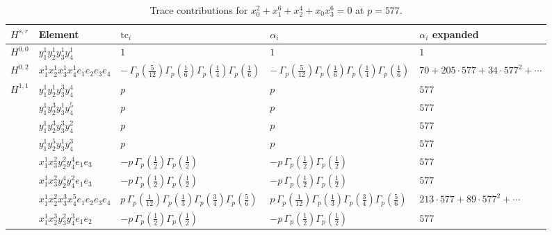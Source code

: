 \documentclass[11pt]{article}
\begin{document}
\begin{table}[ht]
\centering
\caption{Trace contributions for $x_0^{2} + x_1^{6} + x_2^{4} + x_0 x_3^{6} = 0$ at $p=577$.}\label{tab:deformed-27}
\renewcommand{\arraystretch}{1.1}
{\scriptsize
\begin{tabular}{@{}lllll@{}}
\toprule
$H^{s,r}$ & Element & $\mathrm{tc}_i$ & $\alpha_i$ & $\alpha_i$ expanded \\
\midrule
$H^{0,0}$ & $y_{1}^{1} y_{2}^{1} y_{3}^{1} y_{4}^{1}$ & $1$ & $1$ & $1$ \\
\midrule
$H^{0,2}$ & $x_{1}^{1} x_{2}^{1} x_{3}^{1} x_{4}^{1}  e_{1} e_{2} e_{3} e_{4}$ & $- \, \Gamma_p \left( \frac{5}{12} \right) \Gamma_p \left( \frac{1}{6} \right) \Gamma_p \left( \frac{1}{4} \right) \Gamma_p \left( \frac{1}{6} \right)$ & $- \, \Gamma_p \left( \frac{5}{12} \right) \Gamma_p \left( \frac{1}{6} \right) \Gamma_p \left( \frac{1}{4} \right) \Gamma_p \left( \frac{1}{6} \right)$ & $70{+}205{\cdot}577{+}34{\cdot}577^{2}{+}\cdots$ \\
\midrule
$H^{1,1}$ & $y_{1}^{1} y_{2}^{1} y_{3}^{3} y_{4}^{4}$ & $p \,$ & $p \,$ & $577$ \\
 & $y_{1}^{1} y_{2}^{3} y_{3}^{1} y_{4}^{5}$ & $p \,$ & $p \,$ & $577$ \\
 & $y_{1}^{1} y_{2}^{3} y_{3}^{3} y_{4}^{2}$ & $p \,$ & $p \,$ & $577$ \\
 & $y_{1}^{1} y_{2}^{5} y_{3}^{1} y_{4}^{3}$ & $p \,$ & $p \,$ & $577$ \\
 & $x_{1}^{1} x_{3}^{2} y_{2}^{2} y_{4}^{4} e_{1} e_{3}$ & $- p \, \Gamma_p \left( \frac{1}{2} \right) \Gamma_p \left( \frac{1}{2} \right)$ & $- p \, \Gamma_p \left( \frac{1}{2} \right) \Gamma_p \left( \frac{1}{2} \right)$ & $577$ \\
 & $x_{1}^{1} x_{3}^{2} y_{2}^{4} y_{4}^{2} e_{1} e_{3}$ & $- p \, \Gamma_p \left( \frac{1}{2} \right) \Gamma_p \left( \frac{1}{2} \right)$ & $- p \, \Gamma_p \left( \frac{1}{2} \right) \Gamma_p \left( \frac{1}{2} \right)$ & $577$ \\
 & $x_{1}^{1} x_{2}^{2} x_{3}^{3} x_{4}^{5}  e_{1} e_{2} e_{3} e_{4}$ & $p \, \Gamma_p \left( \frac{1}{12} \right) \Gamma_p \left( \frac{1}{3} \right) \Gamma_p \left( \frac{3}{4} \right) \Gamma_p \left( \frac{5}{6} \right)$ & $p \, \Gamma_p \left( \frac{1}{12} \right) \Gamma_p \left( \frac{1}{3} \right) \Gamma_p \left( \frac{3}{4} \right) \Gamma_p \left( \frac{5}{6} \right)$ & $213{\cdot}577{+}89{\cdot}577^{2}{+}\cdots$ \\
 & $x_{1}^{1} x_{2}^{3} y_{3}^{2} y_{4}^{3} e_{1} e_{2}$ & $- p \, \Gamma_p \left( \frac{1}{2} \right) \Gamma_p \left( \frac{1}{2} \right)$ & $- p \, \Gamma_p \left( \frac{1}{2} \right) \Gamma_p \left( \frac{1}{2} \right)$ & $577$ \\

\end{tabular}}
\end{table}
\end{document}
